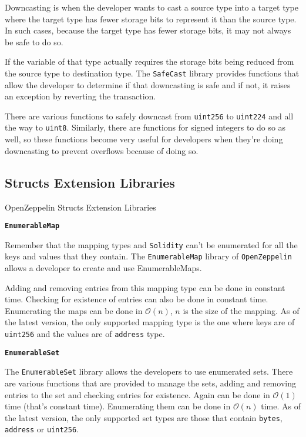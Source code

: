 Downcasting is when the developer wants to cast a source type into a
target type where the target type has fewer storage bits to represent it
than the source type. In such cases, because the target type has fewer
storage bits, it may not always be safe to do so.

If the variable of that type actually requires the storage bits being
reduced from the source type to destination type. The \texttt{SafeCast}
library provides functions that allow the developer to determine if that
downcasting is safe and if not, it raises an exception by reverting the
transaction.

There are various functions to safely downcast from \texttt{uint256} to
\texttt{uint224} and all the way to \texttt{uint8}. Similarly, there are
functions for signed integers to do so as well, so these functions
become very useful for developers when they're doing downcasting to
prevent overflows because of doing so.

\subsection{Structs Extension
Libraries}\label{structs-extension-libraries}

OpenZeppelin Structs Extension Libraries

\textbf{\texttt{EnumerableMap}}

Remember that the mapping types and \texttt{Solidity} can't be
enumerated for all the keys and values that they contain. The
\texttt{EnumerableMap} library of \texttt{OpenZeppelin} allows a
developer to create and use EnumerableMaps.

Adding and removing entries from this mapping type can be done in
constant time. Checking for existence of entries can also be done in
constant time. Enumerating the maps can be done in $\mathcal{O}(n)$,
$n$ is the size of the mapping. As of the latest version, the only
supported mapping type is the one where keys are of \texttt{uint256} and
the values are of \texttt{address} type.

\textbf{\texttt{EnumerableSet}}

The \texttt{EnumerableSet} library allows the developers to use
enumerated sets. There are various functions that are provided to manage
the sets, adding and removing entries to the set and checking entries
for existence. Again can be done in $\mathcal{O}(1)$ time (that's
constant time). Enumerating them can be done in $\mathcal{O}(n)$ time.
As of the latest version, the only supported set types are those that
contain \texttt{bytes}, \texttt{address} or \texttt{uint256}.

